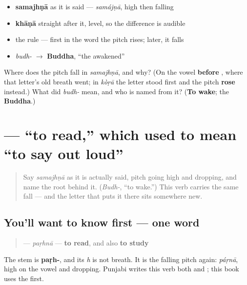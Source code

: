\begin{itemize}
\raggedright
  \item \textbf{samajhṇā} as it is said — \emph{samájṇā}, high then falling
  \item \textbf{khāṇā} straight after it, level, so the difference is audible
  \item the rule — first in the word the pitch rises; later, it falls
  \item \emph{budh-} $\to$ \textbf{Buddha}, “the awakened”
\end{itemize}

\begin{tcolorbox}[breakable,colback=teal!4,colframe=teal!35!black,title={Before you move on}]
Where does the pitch fall in \emph{samajhṇā}, and why? (On the vowel \textbf{before }, where that letter's old breath went; in \emph{kòṛā} the letter stood first and the pitch \textbf{rose} instead.) What did \emph{budh-} mean, and who is named from it? (\textbf{To wake}; the \textbf{Buddha}.)
\end{tcolorbox}
\section[\texorpdfstring{\pa{ਪੜ੍ਹਨਾ} (paṛhnā)}{ਪੜ੍ਹਨਾ (paṛhnā)}]{ — “to read,” which used to mean “to say out loud”}

\label{lesson:PA-C08-parhna}



\begin{quote}
Say \emph{samajhṇā} as it is actually said, pitch going high and dropping, and name the root behind it. (\emph{Budh-}, “to wake.”) This verb carries the same fall — and the letter that puts it there sits somewhere new.
\end{quote}

\subsection*{You'll want to know first — one word}
\begin{quote}
\textbf{} — \emph{paṛhnā} — \textbf{to read}, and also \textbf{to study}
\end{quote}

The stem is \textbf{paṛh-}, and its \emph{h} is not breath. It is the falling pitch again: \emph{páṛnā}, high on the vowel and dropping. Punjabi writes this verb both \textbf{} and \textbf{}; this book uses the first.

